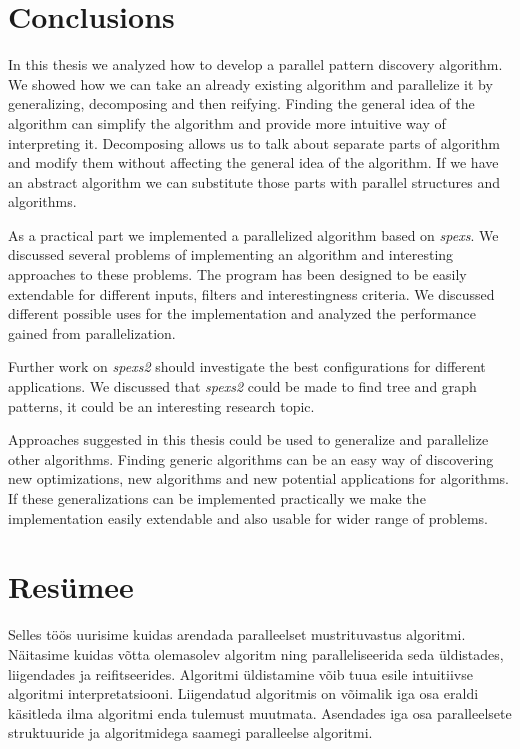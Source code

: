 \chapter{Conclusions}
\label{c:conclusions}

In this thesis we analyzed how to develop a parallel pattern discovery algorithm. We showed how we can take an already existing algorithm and parallelize it by generalizing, decomposing and then reifying. Finding the general idea of the algorithm can simplify the algorithm and provide more intuitive way of interpreting it. Decomposing allows us to talk about separate parts of algorithm and modify them without affecting the general idea of the algorithm. If we have an abstract algorithm we can substitute those parts with parallel structures and algorithms.

As a practical part we implemented a parallelized algorithm based on \emph{spexs}\cite{spexs}. We discussed several problems of implementing an algorithm and interesting approaches to these problems. The program has been designed to be easily extendable for different inputs, filters and interestingness criteria. We discussed different possible uses for the implementation and analyzed the performance gained from parallelization.

Further work on \emph{spexs2} should investigate the best configurations for different applications. We discussed that \emph{spexs2} could be made to find tree and graph patterns, it could be an interesting research topic.

Approaches suggested in this thesis could be used to generalize and parallelize other algorithms. Finding generic algorithms can be an easy way of discovering new optimizations, new algorithms and new potential applications for algorithms. If these generalizations can be implemented practically we make the implementation easily extendable and also usable for wider range of problems.

\chapter{Resümee}
\label{c:kokkuvote}

Selles töös uurisime kuidas arendada paralleelset mustrituvastus algoritmi. Näitasime kuidas võtta olemasolev algoritm ning paralleliseerida seda üldistades, liigendades ja reifitseerides. Algoritmi üldistamine võib tuua esile intuitiivse algoritmi interpretatsiooni. Liigendatud algoritmis on võimalik iga osa eraldi käsitleda ilma algoritmi enda tulemust muutmata. Asendades iga osa paralleelsete struktuuride ja algoritmidega saamegi paralleelse algoritmi.

